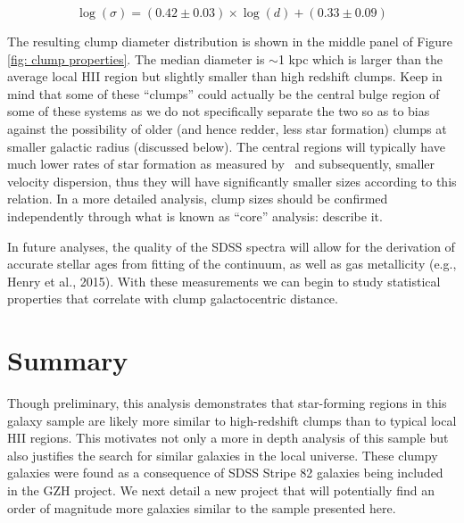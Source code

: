 \begin{equation}\label{eqn: clump diameter}
\log(\sigma) = (0.42 \pm 0.03) \times \log(d) + (0.33 \pm 0.09)
\end{equation}

The resulting clump diameter distribution is shown in the middle panel of Figure \ref{fig: clump properties}. The median diameter is $\sim$1 kpc which is larger than the average local HII region but slightly smaller than high redshift clumps.  Keep in mind that some of these ``clumps'' could actually be the central bulge region of some of these systems as we do not specifically separate the two so as to bias against the possibility of older (and hence redder, less star formation) clumps at smaller galactic radius (discussed below). The central regions will typically have much lower rates of star formation as measured by \ha~and subsequently, smaller velocity dispersion, thus they will have significantly smaller sizes according to this relation. In a more detailed analysis, clump sizes should be confirmed independently through what is known as ``core'' analysis:  describe it. 



In future analyses, the quality of the SDSS spectra will allow for the derivation of accurate stellar ages from fitting of the continuum, as well as gas metallicity (e.g., Henry et al., 2015). With these measurements we can begin to study statistical properties that correlate with clump galactocentric distance. 

\section{Summary}


Though preliminary, this analysis demonstrates that star-forming regions in this galaxy sample are likely more similar to high-redshift clumps than to typical local HII regions. This motivates not only a more in depth analysis of this sample but also justifies the search for similar galaxies in the local universe. These clumpy galaxies were found as a consequence of SDSS Stripe 82 galaxies being included in the GZH project. We next detail a new project that will potentially find an order of magnitude more galaxies similar to the sample presented here.



